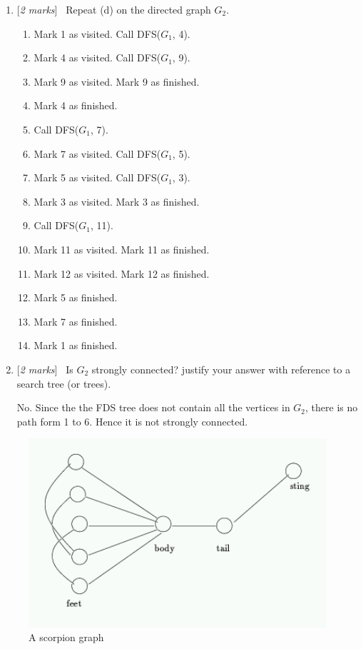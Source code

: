 \documentclass[11pt]{article}
\newcommand{\Q}[1]{\medskip\item {[{\em #1 marks\/}]}\ }
\begin{document}
\begin{enumerate}
\begin{enumerate}
\newpage
	\Q{2} Repeat (d) on the directed graph $G_2$.
	\begin{center}
		\begin{enumerate}[label={\arabic*.}]
			\item Mark 1 as visited. Call DFS($G_1$, 4).
			\item Mark 4 as visited. Call DFS($G_1$, 9).
			\item Mark 9 as visited. Mark 9 as finished.
			\item Mark 4 as finished.
			\item Call DFS($G_1$, 7).
			\item Mark 7 as visited. Call DFS($G_1$, 5).
			\item Mark 5 as visited. Call DFS($G_1$, 3).
			\item Mark 3 as visited. Mark 3 as finished.
			\item Call DFS($G_1$, 11).
			\item Mark 11 as visited. Mark 11 as finished.
			\item Mark 12 as visited. Mark 12 as finished.
			\item Mark 5 as finished.
			\item Mark 7 as finished.
			\item Mark 1 as finished.
		\end{enumerate}
	\end{center}
	
	\Q{2} Is $G_2$ strongly connected? justify your answer with reference to a search tree (or trees).
	
	No. Since the the FDS tree does not contain all the vertices in $G_2$, there is no path form 1 to 6. Hence 
	it is not strongly connected.

\end{enumerate}

\newpage
\begin{figure}[h]
\centerline{\includegraphics[height=7cm]{scorpion.png}}
\caption{A scorpion graph}\label{scorpion}
\end{figure}


\end{enumerate}
\end{document}
